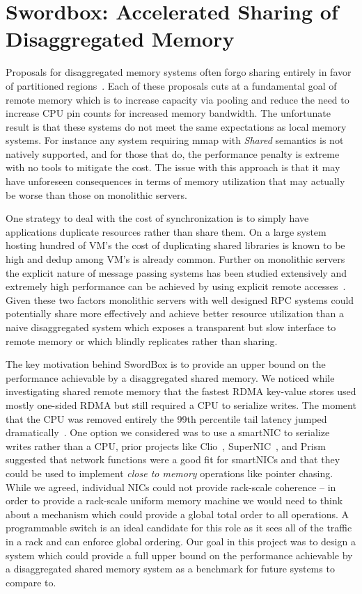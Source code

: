 \documentclass[12pt]{ucsddissertation}
\newcommand{\sword}{SwordBox}
\begin{document}
\chapter{Swordbox: Accelerated Sharing of Disaggregated Memory}
\label{chap:swordbox}

Proposals for disaggregated memory systems often forgo sharing entirely in favor of partitioned
regions~\cite{infiniswap,fastswap,leap,legoos,blade}. Each of these proposals cuts at a fundamental
goal of remote memory which is to increase capacity via pooling and reduce the need to increase CPU
pin counts for increased memory bandwidth. The unfortunate result is that these systems do not meet
the same expectations as local memory systems. For instance any system requiring mmap with
\textit{Shared} semantics is not natively supported, and for those that do, the performance penalty
is extreme with no tools to mitigate the cost. The issue with this approach is that it may have
unforeseen consequences in terms of memory utilization that may actually be worse than those on
monolithic servers. 

One strategy to deal with the cost of synchronization is to simply have applications duplicate
resources rather than share them. On a large system hosting hundred of VM's the cost of duplicating
shared libraries is known to be high and dedup among VM's is already common.  Further on monolithic
servers the explicit nature of message passing systems has been studied extensively and extremely
high performance can be achieved by using explicit remote accesses~\cite{herd, erpc}. Given these
two factors monolithic servers with well designed RPC systems could potentially share more
effectively and achieve better resource utilization than a naive disaggregated system which exposes
a transparent but slow interface to remote memory or which blindly replicates rather than sharing.

The key motivation behind {\sword} is to provide an upper bound on the performance achievable by a
disaggregated shared memory. We noticed while investigating shared remote memory that the fastest
RDMA key-value stores used mostly one-sided RDMA but still required a CPU to serialize writes. The
moment that the CPU was removed entirely the 99th percentile tail latency jumped
dramatically~\cite{clover}. One option we considered was to use a smartNIC to serialize writes
rather than a CPU, prior projects like Clio~\cite{clio}, SuperNIC~\cite{supernic}, and
Prism~\cite{prism} suggested that network functions were a good fit for smartNICs and that they
could be used to implement \textit{close to memory} operations like pointer chasing. While we
agreed, individual NICs could not provide rack-scale coherence -- in order to provide a rack-scale
uniform memory machine we would need to think about a mechanism which could provide a global total
order to all operations. A programmable switch is an ideal candidate for this role as it sees all of
the traffic in a rack and can enforce global ordering. Our goal in this project was to design a
system which could provide a full upper bound on the performance achievable by a disaggregated
shared memory system as a benchmark for future systems to compare to.
\end{document}
